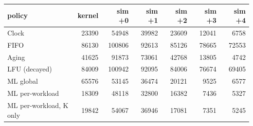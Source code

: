 \begin{tabular}{lrrrrrr}
\toprule
policy & kernel & sim {+}0 & sim {+}1 & sim {+}2 & sim {+}3 & sim {+}4 \\
\midrule
Clock & 23390 & 54948 & 39982 & 23609 & 12041 & 6758 \\
FIFO & 86130 & 100806 & 92613 & 85126 & 78665 & 72553 \\
Aging & 41625 & 91873 & 73061 & 42768 & 13805 & 4742 \\
LFU (decayed) & 84009 & 100942 & 92095 & 84006 & 76674 & 69405 \\
ML global & 65576 & 53145 & 36474 & 20121 & 9525 & 6577 \\
ML per-workload & 18309 & 48118 & 32800 & 16382 & 7436 & 5327 \\
ML per-workload, K only & 19842 & 54067 & 36946 & 17081 & 7351 & 5245 \\
\bottomrule
\end{tabular}

